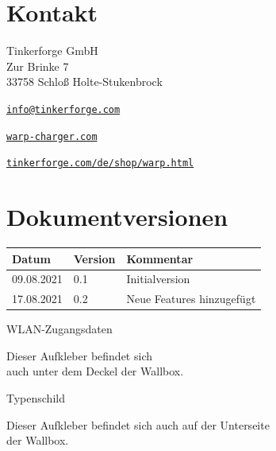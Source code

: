 \documentclass[a4paper,10pt]{article}
\begin{document}
\begin{multicols*}{2}
	\section{Kontakt}
	Tinkerforge GmbH\\ Zur Brinke 7\\ 33758 Schloß Holte-Stukenbrock\\
	\begin{description}[leftmargin=!,labelwidth=\widthof{\textbf{Website}}]
		\item[E-Mail] \href{mailto:info@tinkerforge.com}{\texttt{info@tinkerforge.com}}
		\item[Website] \href{https://warp-charger.com}{\texttt{warp-charger.com}}
		\item[Shop] \href{https://tinkerforge.com/de/shop/warp.html}{\texttt{tinkerforge.com/de/shop/warp.html}}
	\end{description}


	\section{Dokumentversionen}
	\begin{tabular}{lll}
		\toprule
		Datum      & Version & Kommentar                   \\
		\midrule
		09.08.2021 & 0.1     & Initialversion              \\
		17.08.2021 & 0.2     & Neue Features hinzugefügt   \\
		\bottomrule
	\end{tabular}
	\newpage
	\pagestyle{empty}
	\null
	\newpage
	\null
	\vfill
	WLAN-Zugangsdaten
	\begin{tcolorbox}[width=4.2cm,height=2.7cm, boxrule=0.25mm]

	\end{tcolorbox}
	Dieser Aufkleber befindet sich\\ auch unter dem Deckel der Wallbox.
	\columnbreak

	\null
	\vfill
	Typenschild
	\begin{tcolorbox}[width=7.8cm,height=4.1cm, boxrule=0.25mm]

	\end{tcolorbox}
	Dieser Aufkleber befindet sich auch auf der Unterseite\\ der Wallbox.
\end{multicols*}
\end{document}
